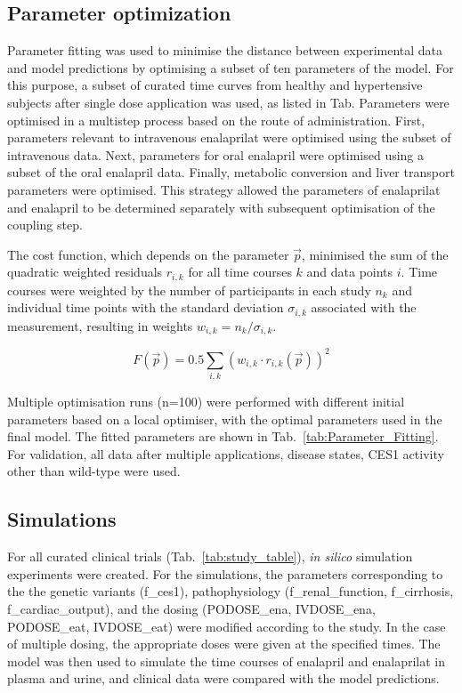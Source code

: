 \documentclass[pharmaceutics,article,submit,pdftex,moreauthors]{Definitions/mdpi}
\begin{document}

\subsection{Parameter optimization}\label{sec:methods_fitting}
Parameter fitting was used to minimise the distance between experimental data and model predictions by optimising a subset of ten parameters of the model. For this purpose, a subset of curated time curves from healthy and hypertensive subjects after single dose application was used, as listed in Tab.
Parameters were optimised in a multistep process based on the route of administration. First, parameters relevant to intravenous enalaprilat were optimised using the subset of intravenous data. Next, parameters for oral enalapril were optimised using a subset of the oral enalapril data. Finally, metabolic conversion and liver transport parameters were optimised. This strategy allowed the parameters of enalaprilat and enalapril to be determined separately with subsequent optimisation of the coupling step.

The cost function, which depends on the parameter $\vec{p}$, minimised the sum of the quadratic weighted residuals $r_{i,k}$ for all time courses $k$ and data points $i$. Time courses were weighted by the number of participants in each study $n_k$ and individual time points with the standard deviation $\sigma_{i,k}$ associated with the measurement, resulting in weights $w_{i,k} = n_k/\sigma_{i,k}$.

\begin{equation*}
   F(\vec{p})= 0.5 \sum_{i,k} \left(w_{i,k} \cdot r_{i,k}(\vec{p})\right)^2 %
\end{equation*}

Multiple optimisation runs (n=100) were performed with different initial parameters based on a local optimiser, with the optimal parameters used in the final model. The fitted parameters are shown in Tab.~\ref{tab:Parameter_Fitting}. For validation, all data after multiple applications, disease states, CES1 activity other than wild-type were used.

\subsection{Simulations}\label{sec:methods_simulations}
For all curated clinical trials (Tab.~\ref{tab:study_table}), \textit{in silico} simulation experiments were created. For the simulations, the parameters corresponding to the the genetic variants (f\_ces1), pathophysiology (f\_renal\_function, f\_cirrhosis, f\_cardiac\_output),  and the dosing (PODOSE\_ena, IVDOSE\_ena, PODOSE\_eat, IVDOSE\_eat) were modified according to the study. In the case of multiple dosing, the appropriate doses were given at the specified times. The model was then used to simulate the time courses of enalapril and enalaprilat in plasma and urine, and clinical data were compared with the model predictions.
\end{document}
